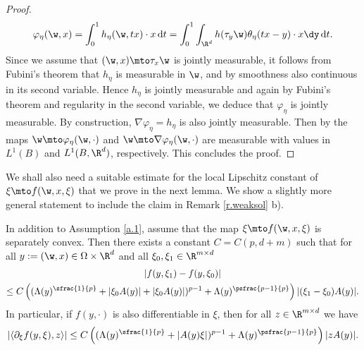 \begin{proof}
\begin{equation*}
\varphi_{\eta}(\w,x)=\int_0^1 h_{\eta}(\w,tx)\cdot x \,\mathrm{d}t=\int_0^1\int_{\R^d}h(\tau_y\w)\theta_{\eta}(tx-y)\cdot x\dy\,\mathrm{d}t.
\end{equation*}
Since we assume that $(\w,x)\mto\tau_{x}\w$ is jointly measurable, it follows from Fubini's theorem that $h_{\eta}$ is measurable in $\w$, and by smoothness also continuous in its second variable. Hence $h_{\eta}$ is jointly measurable and again by Fubini's theorem and regularity in the second variable, we deduce that $\varphi_{\eta}$ is jointly measurable. By construction, $\nabla\varphi_{\eta}=h_{\eta}$ is also jointly measurable. Then by \cite[Lem.\,16 b), p.\,196]{DS} the maps $\w\mto \varphi_{\eta}(\w,\cdot)$ and $\w\mto\nabla\varphi_{\eta}(\w,\cdot)$ are measurable with values in $L^1(B)$ and $L^1(B,\R^d)$, respectively. This concludes the proof.
\end{proof}
We shall also need a suitable estimate for the local Lipschitz constant of $\xi\mto f(\w,x,\xi)$ that we prove in the next lemma. We show a slightly more general statement to include the claim in Remark \ref{r.weaksol} b).
\begin{lemma}\label{l.f_differentiable}
In addition to Assumption \ref{a.1}, assume that the map $\xi\mto f(\w,x,\xi)$ is separately convex. Then there exists a constant $C=C(p,d+m)$ such that for all $y:=(\w,x)\in\Omega\times\R^d$ and all $\xi_0,\xi_1\in\R^{m\times d}$\vspace*{-5pt}
\begin{multline}\label{eq:f_quantitativeLipschitz}
|f(y,\xi_1)-f(y,\xi_0)|\\
\leq C\left((\Lambda(y)^{\sfrac{1}{p}}+|\xi_0A(y)|+|\xi_0A(y)|)^{p-1}+\Lambda(y)^{\psfrac{p-1}{p}}\right)|(\xi_1-\xi_0)A(y)|.
\end{multline}
In particular, if $f(y,\cdot)$ is also differentiable in $\xi$, then for all $z\in\R^{m\times d}$ we have
\begin{equation}\label{eq:f_quantitativedifferentiable}
|\langle \partial_{\xi}f(y,\xi),z\rangle|\leq C\left((\Lambda(y)^{\sfrac{1}{p}}+|A(y)\xi|)^{p-1}+\Lambda(y)^{\psfrac{p-1}{p}}\right)|zA(y)|.
\end{equation}
\end{lemma}
